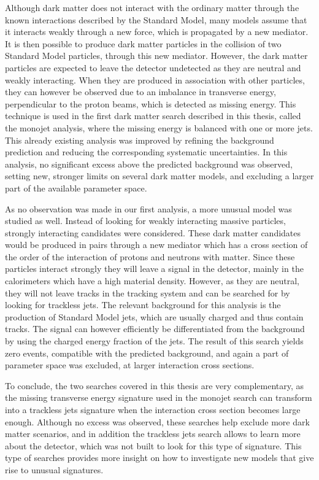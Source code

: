 Although dark matter does not interact with the ordinary matter through the known interactions described by the Standard Model, many models assume that it interacts weakly through a new force, which is propagated by a new mediator. It is then possible to produce dark matter particles in the collision of two Standard Model particles, through this new mediator. However, the dark matter particles are expected to leave the detector undetected as they are neutral and weakly interacting. When they are produced in association with other particles, they can however be observed due to an imbalance in transverse energy, perpendicular to the proton beams, which is detected as missing energy. This technique is used in the first dark matter search described in this thesis, called the monojet analysis,  where the missing energy is balanced with one or more jets. This already existing analysis was improved by refining the background prediction and reducing the corresponding systematic uncertainties. In this analysis, no significant excess above the predicted background was observed, setting new, stronger limits on several dark matter models, and excluding a larger part of the available parameter space.

As no observation was made in our first analysis, a more unusual model was studied as well. Instead of looking for weakly interacting massive particles, strongly interacting candidates were considered. These dark matter candidates would be produced in pairs through a new mediator which has a cross section of the order of the interaction of protons and neutrons with matter. Since these particles interact strongly they will leave a signal in the detector, mainly in the calorimeters which have a high material density. However, as they are neutral, they will not leave tracks in the tracking system and can be searched for by looking for trackless jets. The relevant background for this analysis is the production of Standard Model jets, which are usually charged and thus contain tracks. The signal can however efficiently be differentiated from the background by using the charged energy fraction of the jets. The result of this search yields zero events, compatible with the predicted background, and again a part of parameter space was excluded, at larger interaction cross sections.

To conclude, the two searches covered in this thesis are very complementary, as the missing transverse energy signature used in the monojet search can transform into a trackless jets signature when the interaction cross section becomes large enough. Although no excess was observed, these searches help exclude more dark matter scenarios, and in addition the trackless jets search allows to learn more about the detector, which was not built to look for this type of signature. This type of searches provides more insight on how to investigate new models that give rise to unusual signatures.
